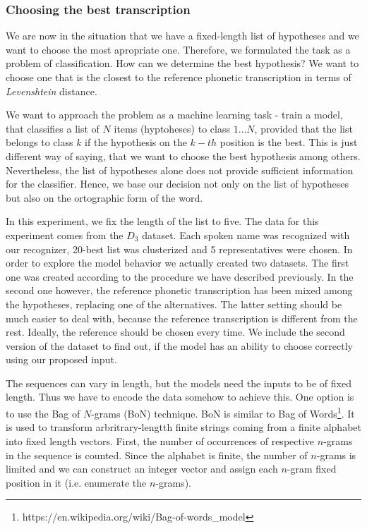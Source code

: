 \subsubsection{Choosing the best transcription}
\label{choosing-best}
We are now in the situation that we have a fixed-length list of hypotheses and we want to choose the most apropriate one.
Therefore, we formulated the task as a problem of classification.
How can we determine the best hypothesis?
We want to choose one that is the closest to the reference phonetic transcription in terms of \textit{Levenshtein} distance.
\par
We want to approach the problem as a machine learning task - train a model, that classifies a list of $N$ items (hyptoheses) to class $1\dots N$, provided that the list belongs to class $k$ if the hypothesis on the $k-th$ position is the best.
This is just different way of saying, that we want to choose the best hypothesis among others.
Nevertheless, the list of hypotheses alone does not provide sufficient information for the classifier.
Hence, we base our decision not only on the list of hypotheses but also on the ortographic form of the word.
\par
In this experiment, we fix the length of the list to five.
The data for this experiment comes from the $D_3$ dataset.
Each spoken name was recognized with our recognizer, 20-best list was clusterized and 5 representatives were chosen.
In order to explore the model behavior we actually created two datasets.
The first one was created according to the procedure we have described previously.
In the second one however, the reference phonetic transcription has been mixed among the hypotheses, replacing one of the alternatives.
The latter setting should be much easier to deal with, because the reference transcription is different from the rest.
Ideally, the reference should be chosen every time.
We include the second version of the dataset to find out, if the model has an ability to choose correctly using our proposed input.
\par
The sequences can vary in length, but the models need the inputs to be of fixed length.
Thus we have to encode the data somehow to achieve this.
One option is to use the Bag of $N$-grams (BoN) technique.
BoN is similar to Bag of Words\footnote{https://en.wikipedia.org/wiki/Bag-of-words\_model}.
It is used to transform arbritrary-lengtth finite strings coming from a finite alphabet into fixed length vectors.
First, the number of occurrences of respective $n$-grams in the sequence is counted.
Since the alphabet is finite, the number of $n$-grams is limited and we can construct an integer vector and assign each $n$-gram fixed position in it (i.e. enumerate the $n$-grams).
